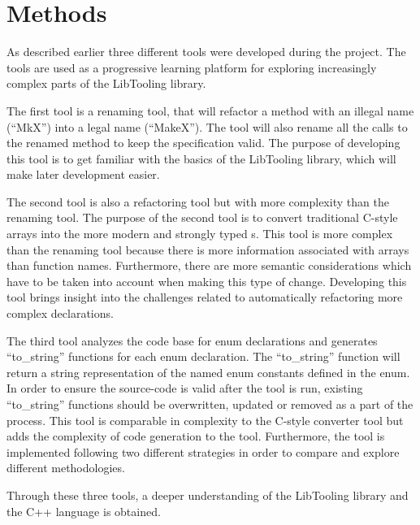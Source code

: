 \section{Methods}
As described earlier three different tools were developed during the project. The tools are used as a progressive learning platform for exploring increasingly complex parts of the LibTooling library. 

The first tool is a renaming tool, that will refactor a method with an illegal name (``MkX'') into a legal name (``MakeX''). The tool will also rename all the calls to the renamed method to keep the specification valid. The purpose of developing this tool is to get familiar with the basics of the LibTooling library, which will make later development easier. 

The second tool is also a refactoring tool but with more complexity than the renaming tool. The purpose of the second tool is to convert traditional C-style arrays into the more modern and strongly typed s. This tool is more complex than the renaming tool because there is more information associated with arrays than function names. Furthermore, there are more semantic considerations which have to be taken into account when making this type of change.
Developing this tool brings insight into the challenges related to automatically refactoring more complex declarations.

The third tool analyzes the code base for enum declarations and generates ``to\_string'' functions for each enum declaration. The ``to\_string'' function will return a string representation of the named enum constants defined in the enum. In order to ensure the source-code is valid after the tool is run, existing ``to\_string'' functions should be overwritten, updated or removed as a part of the process. 
This tool is comparable in complexity to the C-style converter tool but adds the complexity of code generation to the tool.
Furthermore, the tool is implemented following two different strategies in order to compare and explore different methodologies.

Through these three tools, a deeper understanding of the LibTooling library and the C++ language is obtained.